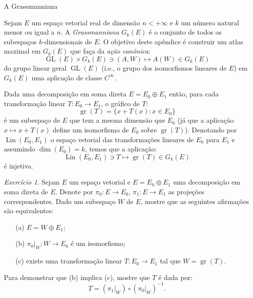 \documentclass[oneside,11pt]{amsart}
\DeclareMathOperator{\Gr}{gr}
\DeclareMathOperator{\Lin}{Lin}
\DeclareMathOperator{\Dim}{dim}
\DeclareMathOperator{\GL}{GL}
\theoremstyle{remark}\newtheorem{exercise}{Exercício}[section]
\theoremstyle{plain}\newtheorem{teo}{Teorema}[section]
\theoremstyle{plain}\newtheorem{lem}[teo]{Lema}
\theoremstyle{plain}\newtheorem{prop}[teo]{Proposição}
\theoremstyle{definition}\newtheorem{defin}[teo]{Definição}
\theoremstyle{remark}\newtheorem{rem}[teo]{Observação}
\theoremstyle{definition}\newtheorem{example}[teo]{Exemplo}
\numberwithin{equation}{section}
\begin{document}
\begin{section}{A Grassmanniana}\label{sec:Grassmanniana}

Sejam $E$ um espaço vetorial real de dimensão $n<+\infty$ e $k$ um número natural menor ou igual a $n$. A {\em Grassmanniana\/}
$G_k(E)$ é o conjunto de todos os subespaços $k$-dimensionais de $E$. O objetivo deste apêndice é construir um atlas
maximal em $G_k(E)$ que faça da {\em ação canônica}:
\begin{equation}\label{eq:acaoGLEGkE}
\GL(E)\times G_k(E)\ni(A,W)\longmapsto A(W)\in G_k(E)
\end{equation}
do grupo linear geral $\GL(E)$ (i.e., o grupo dos isomorfismos lineares de $E$) em $G_k(E)$
uma aplicação de classe $C^\infty$.

Dada uma decomposição em soma direta $E=E_0\oplus E_1$ então, para cada transformação linear $T:E_0\to E_1$, o gráfico de $T$:
\[\Gr(T)=\big\{x+T(x):x\in E_0\big\}\]
é um subespaço de $E$ que tem a mesma dimensão que $E_0$ (já que a aplicação $x\mapsto x+T(x)$ define um isomorfismo de $E_0$ sobre $\Gr(T)$). Denotando
por $\Lin(E_0,E_1)$ o espaço vetorial das transformações lineares de $E_0$ para $E_1$ e assumindo $\Dim(E_0)=k$, temos que a aplicação:
\begin{equation}\label{eq:TGrT}
\Lin(E_0,E_1)\ni T\longmapsto\Gr(T)\in G_k(E)
\end{equation}
é injetiva.

\begin{exercise}\label{exe:condGrT}
Sejam $E$ um espaço vetorial e $E=E_0\oplus E_1$ uma decomposição em soma direta de $E$. Denote por $\pi_0:E\to E_0$, $\pi_1:E\to E_1$ as projeções
correspondentes. Dado um subespaço $W$ de $E$, mostre que as seguintes afirmações
são equivalentes:
\begin{itemize}
\item[(a)] $E=W\oplus E_1$;
\item[(b)] $\pi_0\vert_W:W\to E_0$ é um isomorfismo;
\item[(c)] existe uma transformação linear $T:E_0\to E_1$ tal que $W=\Gr(T)$.
\end{itemize}
Para demonstrar que (b) implica (c), mostre que $T$ é dada por:
\[T=(\pi_1\vert_W)\circ(\pi_0\vert_W)^{-1}.\]
\end{exercise}


\end{section}
\end{document}
